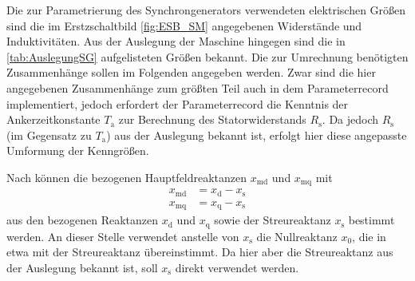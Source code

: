 Die zur Parametrierung des Synchrongenerators verwendeten elektrischen Größen sind die im Erstzschaltbild \cref{fig:ESB_SM} angegebenen Widerstände und Induktivitäten. Aus der Auslegung der Maschine hingegen sind die in \cref{tab:AuslegungSG} aufgelisteten Größen bekannt. Die zur Umrechnung benötigten Zusammenhänge sollen im Folgenden angegeben werden. Zwar sind die hier angegebenen Zusammenhänge zum größten Teil auch in dem Parameterrecord  implementiert, jedoch erfordert der Parameterrecord die Kenntnis der Ankerzeitkonstante \(T_{\mathrm{a}}\) zur Berechnung des Statorwiderstands \(R_{\mathrm{s}}\). Da jedoch \(R_{\mathrm{s}}\) (im Gegensatz zu \(T_{\mathrm{a}}\)) aus der Auslegung bekannt ist, erfolgt hier diese angepasste Umformung der Kenngrößen.

Nach \cite[S. 264]{kralModelicaObjektorientierteModellbildung2019} können die bezogenen Hauptfeldreaktanzen \(x_{\mathrm{md}}\) und \(x_{\mathrm{mq}}\) mit
\begin{align}
    x_{\mathrm{md}} &= x_{\mathrm{d}} - x_{\mathrm{s}} \\
    x_{\mathrm{mq}} &= x_{\mathrm{q}} - x_{\mathrm{s}}
\end{align}
aus den bezogenen Reaktanzen \(x_{\mathrm{d}}\) und \(x_{\mathrm{q}}\) sowie der Streureaktanz \(x_{\mathrm{s}}\) bestimmt werden. An dieser Stelle verwendet \cite[]{kralModelicaObjektorientierteModellbildung2019} anstelle von \(x_{\mathrm{s}}\) die Nullreaktanz \(x_{\mathrm{0}}\), die in etwa mit der Streureaktanz übereinstimmt. Da hier aber die Streureaktanz aus der Auslegung bekannt ist, soll \(x_{\mathrm{s}}\) direkt verwendet werden. 

